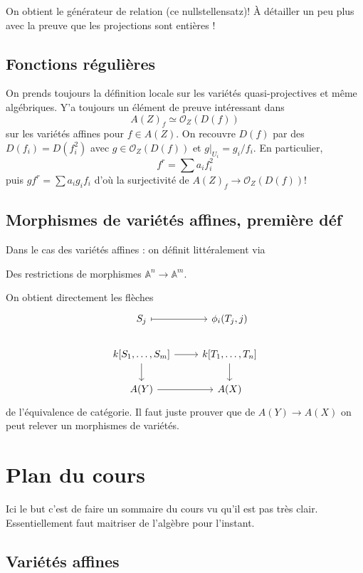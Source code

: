 \documentclass[a4paper,12pt]{book}
\newcommand{\A}{\mathbb{A}}
\newcommand{\Or}{\mathcal{O}}
\theoremstyle{plain}
\theoremstyle{definition}
\theoremstyle{remark}
\begin{document}
On obtient le générateur de relation (ce nullstellensatz)! À détailler un
peu plus avec la preuve que les projections sont entières !

\section{Fonctions régulières}
On prends toujours la définition locale sur les variétés 
quasi-projectives et même algébriques. Y'a toujours un élément de preuve
intéressant dans 
\[A(Z)_f\simeq \Or_Z(D(f))\]
sur les variétés affines pour $f\in A(Z)$. On recouvre $D(f)$ par des
$D(f_i)=D(f_i^2)$ avec $g\in \Or_Z(D(f))$ et $g|_{U_i}=g_i/f_i$.
En particulier, 
\[f^r=\sum a_if_i^2\]
puis $gf^r=\sum a_ig_if_i$ d'où la surjectivité de 
$A(Z)_f\to \Or_Z(D(f))$! 

\section{Morphismes de variétés affines, première déf}
Dans le cas des variétés affines : on définit littéralement via 
\begin{center}
    Des restrictions de morphismes $\A^n\to \A^m$.
\end{center}
On obtient directement les flèches 
\[\begin{tikzcd}
	{S_j} & {\phi_i(T_j,j)} \\
	{k[S_1,\ldots,S_m]} & {k[T_1,\ldots,T_n]} \\
	{A(Y)} & {A(X)}
	\arrow[maps to, from=1-1, to=1-2]
	\arrow[from=2-1, to=2-2]
	\arrow[from=2-1, to=3-1]
	\arrow[from=2-2, to=3-2]
	\arrow[from=3-1, to=3-2]
\end{tikzcd}\]
de l'équivalence de catégorie. Il faut juste prouver que de 
$A(Y)\to A(X)$ on peut relever un morphismes de variétés.


\chapter{Plan du cours}
Ici le but c'est de faire un sommaire du cours vu qu'il est pas très 
clair. Essentiellement faut maitriser de l'algèbre pour l'instant.


\section{Variétés affines}
\end{document}
